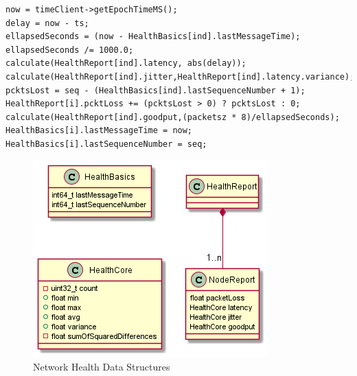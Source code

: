 \documentclass[letterpaper,twocolumn,12pt]{article}
\begin{document}
\begin{lstlisting}[caption={update\_health(ind, packetsz, ts, seq)},label=code:update, float=t] 
now = timeClient->getEpochTimeMS();
delay = now - ts;
ellapsedSeconds = (now - HealthBasics[ind].lastMessageTime);
ellapsedSeconds /= 1000.0;
calculate(HealthReport[ind].latency, abs(delay));
calculate(HealthReport[ind].jitter,HealthReport[ind].latency.variance);
pcktsLost = seq - (HealthBasics[ind].lastSequenceNumber + 1);
HealthReport[i].pcktLoss += (pcktsLost > 0) ? pcktsLost : 0;
calculate(HealthReport[ind].goodput,(packetsz * 8)/ellapsedSeconds);
HealthBasics[i].lastMessageTime = now;
HealthBasics[i].lastSequenceNumber = seq;
\end{lstlisting}

\begin{figure}[]
    \centering
    \includegraphics[width=\linewidth]{out/images/network_health/network_health.png}
    \caption{Network Health Data Structures}
    \label{fig:network_health_ds}
\end{figure}
\end{document}
